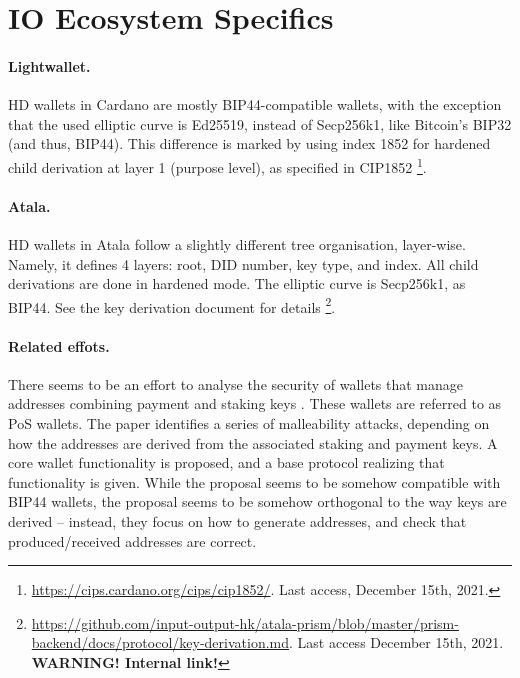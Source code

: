 \section{IO Ecosystem Specifics}
\label{sec:io}

\paragraph{Lightwallet.} HD wallets in Cardano are mostly BIP44-compatible
wallets, with the exception that the used elliptic curve is Ed25519,
instead of Secp256k1, like Bitcoin's BIP32 (and thus, BIP44). This
difference is marked by using index 1852 for hardened child derivation at
layer 1 (purpose level), as specified in CIP1852%
\footnote{\url{https://cips.cardano.org/cips/cip1852/}. Last access, December
  15th, 2021.}.

\paragraph{Atala.} HD wallets in Atala follow a slightly different tree
organisation, layer-wise. Namely, it defines 4 layers: root, DID number, key
type, and index. All child derivations are done in hardened mode. The elliptic
curve is Secp256k1, as BIP44. See the key derivation document for details%
\footnote{\url{https://github.com/input-output-hk/atala-prism/blob/master/prism-backend/docs/protocol/key-derivation.md}. Last access December 15th, 2021. \textbf{WARNING!
    Internal link!}}.

\paragraph{Related effots.} There seems to be an effort to analyse the security
of wallets that manage addresses combining payment and staking keys \cite{kkl20}.
These wallets are referred to as PoS wallets. The paper identifies a series of
malleability attacks, depending on how the addresses are derived from the
associated staking and payment keys. A core wallet functionality is proposed,
and a base protocol realizing that functionality is given. While the proposal
seems to be somehow compatible with BIP44 wallets, the proposal seems to be
somehow orthogonal to the way keys are derived -- instead, they focus on how
to generate addresses, and check that produced/received addresses are correct.

